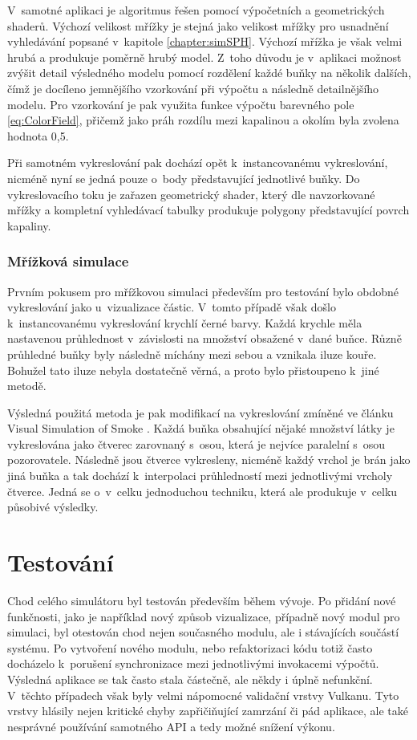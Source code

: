 V~samotné aplikaci je algoritmus řešen pomocí výpočetních a geometrických shaderů. Výchozí velikost mřížky je stejná jako velikost mřížky pro usnadnění vyhledávání popsané v~kapitole \ref{chapter:simSPH}. Výchozí mřížka je však velmi hrubá a produkuje poměrně hrubý model. Z~toho důvodu je v~aplikaci možnost zvýšit detail výsledného modelu pomocí rozdělení každé buňky na několik dalších, čímž je docíleno jemnějšího vzorkování při výpočtu a následně detailnějšího modelu. Pro vzorkování je pak využita funkce výpočtu barevného pole \ref{eq:ColorField}, přičemž jako práh rozdílu mezi kapalinou a okolím byla zvolena hodnota 0,5. \cite{renderingSPH}

Při samotném vykreslování pak dochází opět k~instancovanému vykreslování, nicméně nyní se jedná pouze o~body představující jednotlivé buňky. Do vykreslovacího toku je zařazen geometrický shader, který dle navzorkované mřížky a kompletní vyhledávací tabulky produkuje polygony představující povrch kapaliny.

\subsection{Mřížková simulace}
\label{chapter:vizGrid}
Prvním pokusem pro mřížkovou simulaci především pro testování bylo obdobné vykreslování jako u~vizualizace částic. V~tomto případě však došlo k~instancovanému vykreslování krychlí černé barvy. Každá krychle měla nastavenou průhlednost v~závislosti na množství obsažené v~dané buňce. Různě průhledné buňky byly následně míchány mezi sebou a vznikala iluze kouře. Bohužel tato iluze nebyla dostatečně věrná, a proto bylo přistoupeno k~jiné metodě.

Výsledná použitá metoda je pak modifikací na vykreslování zmíněné ve článku Visual Simulation of Smoke \cite{visualSmoke}. Každá buňka obsahující nějaké množství látky je vykreslována jako čtverec zarovnaný s~osou, která je nejvíce paralelní s~osou pozorovatele. Následně jsou čtverce vykresleny, nicméně každý vrchol je brán jako jiná buňka a tak dochází k~interpolaci průhledností mezi jednotlivými vrcholy čtverce. Jedná se o~v~celku jednoduchou techniku, která ale produkuje v~celku působivé výsledky.


\chapter{Testování}
\label{chapter:testovani}
Chod celého simulátoru byl testován především během vývoje. Po přidání nové funkčnosti, jako je například nový způsob vizualizace, případně nový modul pro simulaci, byl otestován chod nejen současného modulu, ale i stávajících součástí systému. Po vytvoření nového modulu, nebo refaktorizaci kódu totiž často docházelo k~porušení synchronizace mezi jednotlivými invokacemi výpočtů. Výsledná aplikace se tak často stala částečně, ale někdy i úplně nefunkční. V~těchto případech však byly velmi nápomocné validační vrstvy Vulkanu. Tyto vrstvy hlásily nejen kritické chyby zapřičiňující zamrzání či pád aplikace, ale také nesprávné používání samotného API a tedy možné snížení výkonu.

